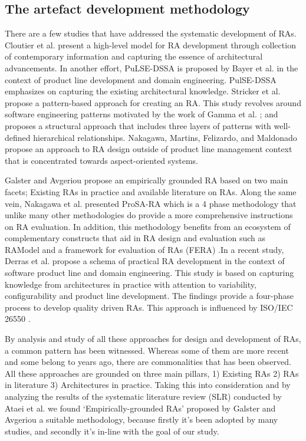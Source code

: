 \documentclass[review]{elsarticle}
\begin{document}
\subsection{The artefact development methodology}


There are a few studies that have addressed the systematic development of RAs. Cloutier et al. \cite{Cloutier} present a high-level model for RA development through collection of contemporary information and capturing the essence of architectural advancements. In another effort, PuLSE-DSSA is proposed by Bayer et al. \cite{bayer2004definition} in the context of product line development and domain engineering. PulSE-DSSA emphasizes on capturing the existing architectural knowledge. Stricker et al. \cite{stricker2010creating} propose a pattern-based approach for creating an RA. This study revolves around software engineering patterns motivated by the work of Gamma et al. \cite{gamma1995design}; and proposes a structural approach that includes three layers of patterns with well-defined hierarchical relationships. Nakagawa, Martins, Felizardo, and Maldonado \cite{nakagawa2009towards} propose an approach to RA design outside of product line management context that is concentrated towards aspect-oriented systems.

Galster and Avgeriou \cite{galster2011empirically} propose an empirically grounded RA based on two main facets; Existing RAs in practice and available literature on RAs. Along the same vein, Nakagawa et al. \cite{nakagawa2014consolidating} presented ProSA-RA which is a 4 phase methodology that unlike many other methodologies do provide a more comprehensive instructions on RA evaluation. In addition, this methodology benefits from an ecosystem of complementary constructs that aid in RA design and evaluation such as RAModel \cite{nakagawa2012ramodel} and a framework for evaluation of RAs (FERA) \cite{santos2013checklist}.In a recent study, Derras et al. \cite{derras2018reference} propose a schema of practical RA development in the context of software product line and domain engineering. This study is based on capturing knowledge from architectures in practice with attention to variability, configurability and product line development. The findings provide a four-phase process to develop quality driven RAs. This approach is influenced by ISO/IEC 26550 \cite{wg2015iso}.

By analysis and study of all these approaches for design and development of RAs, a common pattern has been witnessed. Whereas some of them are more recent and some belong to years ago, there are commonalities that has been observed. All these approaches are grounded on three main pillars, 1) Existing RAs 2) RAs in literature 3) Architectures in practice. Taking this into consideration and by analyzing the results of the systematic literature review (SLR) conducted by Ataei et al. \cite{AtaeiACIS} we found `Empirically-grounded RAs' proposed by Galster and Avgeriou \cite{galster2011empirically} a suitable methodology, because firstly it's been adopted by many studies, and secondly it's in-line with the goal of our study.
\end{document}
